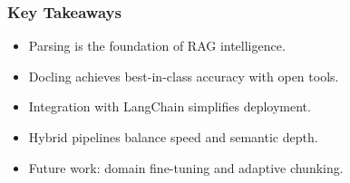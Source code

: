 \begin{frame}[fragile]\frametitle{Key Takeaways}
      \begin{itemize}
        \item Parsing is the foundation of RAG intelligence.
        \item Docling achieves best-in-class accuracy with open tools.
        \item Integration with LangChain simplifies deployment.
        \item Hybrid pipelines balance speed and semantic depth.
        \item Future work: domain fine-tuning and adaptive chunking.
      \end{itemize}
\end{frame}
